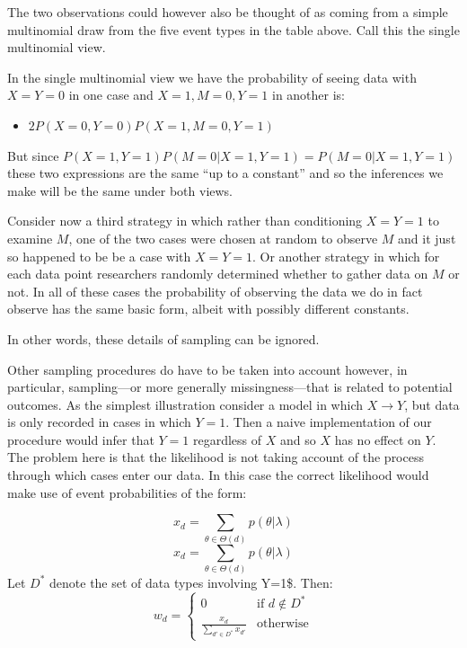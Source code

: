 \documentclass[
  12pt,
]{book}
\providecommand{\tightlist}{%
  \setlength{\itemsep}{0pt}\setlength{\parskip}{0pt}}
\begin{document}
The two observations could however also be thought of as coming from a simple multinomial draw from the five event types in the table above. Call this the single multinomial view.

In the single multinomial view we have the probability of seeing data with \(X=Y=0\) in one case and \(X=1, M=0, Y=1\) in another is:

\begin{itemize}
\tightlist
\item
  \(2P(X=0, Y=0)P(X=1, M=0, Y=1)\)
\end{itemize}

But since \(P(X=1, Y=1)P(M=0 | X=1, Y=1) = P(M=0 | X=1, Y=1)\) these two expressions are the same ``up to a constant'' and so the inferences we make will be the same under both views.

Consider now a third strategy in which rather than conditioning \(X=Y=1\) to examine \(M\), one of the two cases were chosen at random to observe \(M\) and it just so happened to be be a case with \(X=Y=1\). Or another strategy in which for each data point researchers randomly determined whether to gather data on \(M\) or not. In all of these cases the probability of observing the data we do in fact observe has the same basic form, albeit with possibly different constants.

In other words, these details of sampling can be ignored.

Other sampling procedures do have to be taken into account however, in particular, sampling---or more generally missingness---that is related to potential outcomes. As the simplest illustration consider a model in which \(X \rightarrow Y\), but data is only recorded in cases in which \(Y=1\). Then a naive implementation of our procedure would infer that \(Y=1\) regardless of \(X\) and so \(X\) has no effect on \(Y\). The problem here is that the likelihood is not taking account of the process through which cases enter our data. In this case the correct likelihood would make use of event probabilities of the form:

\[x_d = \sum_{\theta \in \Theta(d)}p(\theta|\lambda)\]
\[x_d = \sum_{\theta \in \Theta(d)}p(\theta|\lambda)\]
Let \(D^*\) denote the set of data types involving Y=1\$. Then:
\[w_d =  \left\{ \begin{array}{cc}
0 & \text{if } d\not\in D^* \\
\frac{x_d}{\sum_{d'\in D^*}x_{d'}} & \text{otherwise} \end{array} \right.\]
\end{document}
